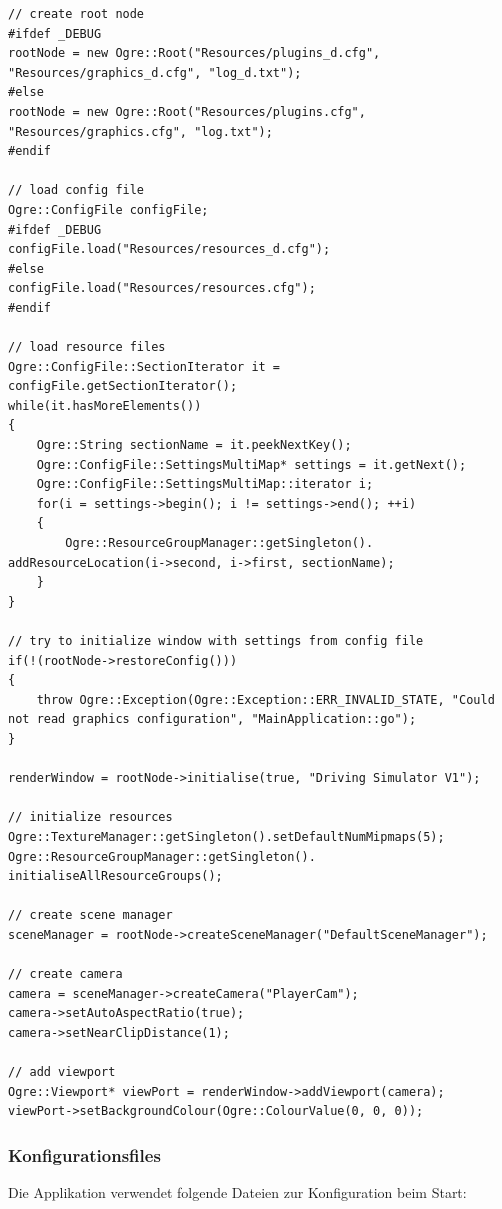 \begin{lstlisting}[caption={Laden der Konfigurationsdateien},label={laden_konfigurationsdateien}]
// create root node
#ifdef _DEBUG
rootNode = new Ogre::Root("Resources/plugins_d.cfg", "Resources/graphics_d.cfg", "log_d.txt");
#else
rootNode = new Ogre::Root("Resources/plugins.cfg", "Resources/graphics.cfg", "log.txt");
#endif

// load config file
Ogre::ConfigFile configFile;
#ifdef _DEBUG
configFile.load("Resources/resources_d.cfg");
#else
configFile.load("Resources/resources.cfg");
#endif

// load resource files
Ogre::ConfigFile::SectionIterator it = configFile.getSectionIterator();
while(it.hasMoreElements())
{
	Ogre::String sectionName = it.peekNextKey();
	Ogre::ConfigFile::SettingsMultiMap* settings = it.getNext();
	Ogre::ConfigFile::SettingsMultiMap::iterator i;
	for(i = settings->begin(); i != settings->end(); ++i)
	{
		Ogre::ResourceGroupManager::getSingleton(). addResourceLocation(i->second, i->first, sectionName);
	}
}

// try to initialize window with settings from config file
if(!(rootNode->restoreConfig()))
{
	throw Ogre::Exception(Ogre::Exception::ERR_INVALID_STATE, "Could not read graphics configuration", "MainApplication::go");
}

renderWindow = rootNode->initialise(true, "Driving Simulator V1");

// initialize resources
Ogre::TextureManager::getSingleton().setDefaultNumMipmaps(5);
Ogre::ResourceGroupManager::getSingleton(). initialiseAllResourceGroups();

// create scene manager
sceneManager = rootNode->createSceneManager("DefaultSceneManager");

// create camera
camera = sceneManager->createCamera("PlayerCam");
camera->setAutoAspectRatio(true);
camera->setNearClipDistance(1);

// add viewport
Ogre::Viewport* viewPort = renderWindow->addViewport(camera);
viewPort->setBackgroundColour(Ogre::ColourValue(0, 0, 0));
\end{lstlisting}

\subsubsection{Konfigurationsfiles}
\label{sec:konfigurationsfiles}

Die Applikation verwendet folgende Dateien zur Konfiguration beim Start:

